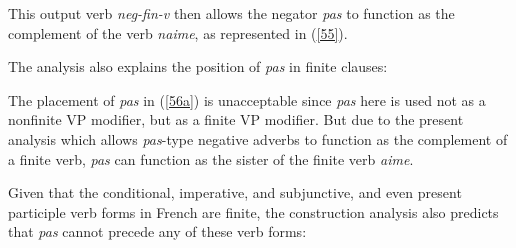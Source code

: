 \documentclass[output=paper]{langsci/langscibook}
\begin{document}
\noindent
This output verb {\it neg-fin-v} then allows the negator \emph{pas} to function
as the complement of the verb {\it naime}, as represented in (\ref{55}).

\be
\ex \label{55} \small{}
\ee




The analysis also explains the position of \emph{pas} in
finite clauses:

\be
\ex \begin{xlist}
 \label{56a}
\end{xlist}
\ee

\noindent
The placement of {\it pas} in (\ref{56a}) is unacceptable since
\emph{pas} here is used not as a nonfinite VP modifier, but as
a finite VP modifier. But due to the
present analysis which allows {\it pas}-type negative adverbs
to function as the complement of a finite verb,
\emph{pas} can function as
the sister of the finite verb
\emph{aime}.

Given that the conditional, imperative, and subjunctive,
and even present participle verb forms in French are finite, the
construction
analysis also predicts that \emph{pas} cannot precede any of these verb
forms:
\end{document}
